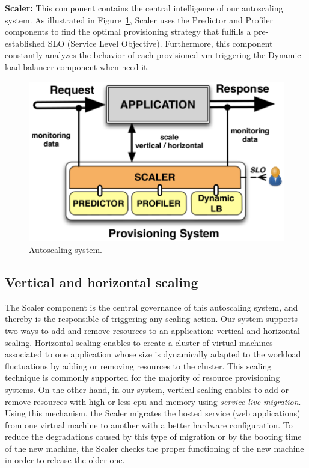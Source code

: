 \vspace{2mm}

\textbf{Scaler:} This component contains the central intelligence of our autoscaling system. As illustrated in Figure~\ref{autoScalingSys}, Scaler uses the Predictor and Profiler components to find the optimal provisioning strategy that fulfills a pre-established SLO (Service Level Objective). Furthermore, this component constantly analyzes the behavior of each provisioned vm triggering the Dynamic load balancer component when need it.

\begin{figure}[htb]
  \begin{center}
    \includegraphics[width=.85\linewidth]{images/monitoringSchema}
  \end{center}
\vspace{-5mm}
  \caption{Autoscaling system.}
  \label{autoScalingSys}
\end{figure}


\subsection{Vertical and horizontal scaling}
The Scaler component is the central governance of this autoscaling system, and thereby is the responsible of triggering any scaling action. Our system supports two ways to add and remove resources to an application: vertical and horizontal scaling. Horizontal scaling enables to create a cluster of virtual machines associated to one application whose size is dynamically adapted to the workload fluctuations by adding or removing resources to the cluster. This scaling technique is commonly supported for the majority of resource provisioning systems. On the other hand, in our system, vertical scaling enables to add or remove resources with high or less cpu and memory using \emph{service live migration}. Using this mechanism, the Scaler migrates the hosted service (web applications) from one virtual machine to another with a better hardware configuration. To reduce the degradations caused by this type of migration or by the booting time of the new machine, the Scaler checks the proper functioning of the new machine in order to release the older one.

